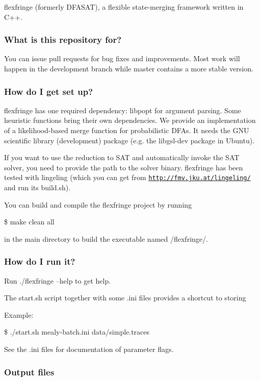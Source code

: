 flexfringe (formerly D\+F\+A\+S\+AT), a flexible state-\/merging framework written in C++.

\subsubsection*{What is this repository for?}

You can issue pull requests for bug fixes and improvements. Most work will happen in the development branch while master contains a more stable version.

\subsubsection*{How do I get set up?}

flexfringe has one required dependency\+: libpopt for argument parsing. Some heuristic functions bring their own dependencies. We provide an implementation of a likelihood-\/based merge function for probabilistic D\+F\+As. It needs the G\+NU scientific library (development) package (e.\+g. the libgsl-\/dev package in Ubuntu).

If you want to use the reduction to S\+AT and automatically invoke the S\+AT solver, you need to provide the path to the solver binary. flexfringe has been tested with lingeling (which you can get from \href{http://fmv.jku.at/lingeling/}{\tt http\+://fmv.\+jku.\+at/lingeling/} and run its build.\+sh).

You can build and compile the flexfringe project by running

\$ make clean all

in the main directory to build the executable named /flexfringe/.

\subsubsection*{How do I run it?}

Run ./flexfringe --help to get help.

The start.\+sh script together with some .ini files provides a shortcut to storing

Example\+:

\$ ./start.sh mealy-\/batch.\+ini data/simple.\+traces

See the .ini files for documentation of parameter flags.

\subsubsection*{Output files}


